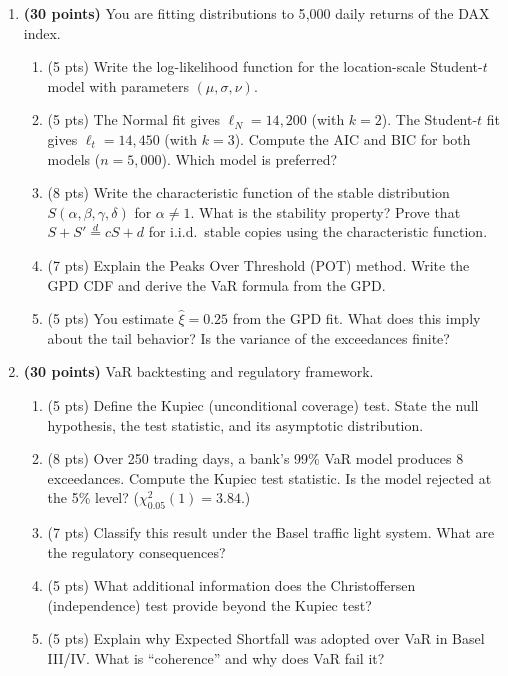 \documentclass[11pt, a4paper]{article}
\theoremstyle{definition}
\begin{document}
\begin{enumerate}[label=\textbf{MSc-Q\arabic*.}]

\item \textbf{(30 points)} You are fitting distributions to 5{,}000 daily returns of the DAX index.

\begin{enumerate}[label=(\alph*)]
  \item (5 pts) Write the log-likelihood function for the location-scale Student-$t$ model with parameters $(\mu, \sigma, \nu)$.
  \item (5 pts) The Normal fit gives $\ell_N = 14{,}200$ (with $k = 2$). The Student-$t$ fit gives $\ell_t = 14{,}450$ (with $k = 3$). Compute the AIC and BIC for both models ($n = 5{,}000$). Which model is preferred?
  \item (8 pts) Write the characteristic function of the stable distribution $S(\alpha, \beta, \gamma, \delta)$ for $\alpha \neq 1$. What is the stability property? Prove that $S + S' \stackrel{d}{=} c S + d$ for i.i.d.\ stable copies using the characteristic function.
  \item (7 pts) Explain the Peaks Over Threshold (POT) method. Write the GPD CDF and derive the VaR formula from the GPD.
  \item (5 pts) You estimate $\hat{\xi} = 0.25$ from the GPD fit. What does this imply about the tail behavior? Is the variance of the exceedances finite?
\end{enumerate}

\item \textbf{(30 points)} VaR backtesting and regulatory framework.

\begin{enumerate}[label=(\alph*)]
  \item (5 pts) Define the Kupiec (unconditional coverage) test. State the null hypothesis, the test statistic, and its asymptotic distribution.
  \item (8 pts) Over 250 trading days, a bank's 99\% VaR model produces 8 exceedances. Compute the Kupiec test statistic. Is the model rejected at the 5\% level? ($\chi^2_{0.05}(1) = 3.84$.)
  \item (7 pts) Classify this result under the Basel traffic light system. What are the regulatory consequences?
  \item (5 pts) What additional information does the Christoffersen (independence) test provide beyond the Kupiec test?
  \item (5 pts) Explain why Expected Shortfall was adopted over VaR in Basel III/IV. What is ``coherence'' and why does VaR fail it?
\end{enumerate}


\end{enumerate}
\end{document}
